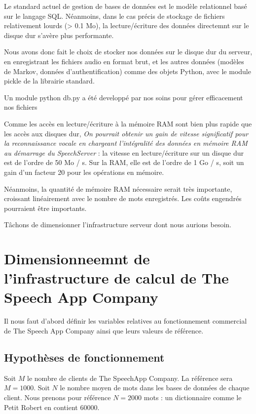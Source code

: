 \documentclass[a4paper,12pt]{report}
\begin{document}
\medskip{}

Le standard actuel de gestion de bases de données est le modèle relationnel basé sur le langage SQL. Néanmoins, dans le cas précis de stockage de fichiers relativement lourds (> 0.1 Mo), la lecture/écriture des données directemnt sur le disque dur s'avère plus performante.

\medskip{}

Nous avons donc fait le choix de stocker nos données sur le disque dur du serveur, en enregistrant les fichiers audio en format brut, et les autres données (modèles de Markov, données d'authentification) comme des objets Python, avec le module pickle de la librairie standard.

\smallskip{}

Un module python db.py a été developpé par nos soins pour gérer efficacement nos fichiers

\bigskip{}

Comme les accès en lecture/écriture à la mémoire RAM sont bien plus rapide que les accès aux disques dur,
\emph{On pourrait obtenir un gain de vitesse significatif pour la reconnaissance vocale en chargeant l'intégralité des données en mémoire RAM au démarrage du SpeechServer} : la vitesse en lecture/écriture sur un disque dur est de l'ordre de 50 Mo / s. Sur la RAM, elle est de l'ordre de 1 Go / s, soit un gain d'un facteur 20 pour les opérations en mémoire.

Néanmoins, la quantité de mémoire RAM nécessaire serait très importante, croissant linéairement avec le nombre de mots enregistrés. Les coûts engendrés pourraient être importants.

Tâchons de dimensionner l'infrastructure serveur dont nous aurions besoin.

\section{Dimensionneemnt de l'infrastructure de calcul de The Speech App Company}

Il nous faut d'abord définir les variables relatives au fonctionnement commercial de The Speech App Company ainsi que leurs valeurs de référence.

\subsection{Hypothèses de fonctionnement}

Soit $M$ le nombre de clients de The SpeechApp Company. La référence sera $M = 1000$.
Soit $N$ le nombre moyen de mots dans les bases de données de chaque client.
Nous prenons pour référence $N = 2000$ mots : un dictionnaire comme le Petit Robert en contient $60000$.
\end{document}
